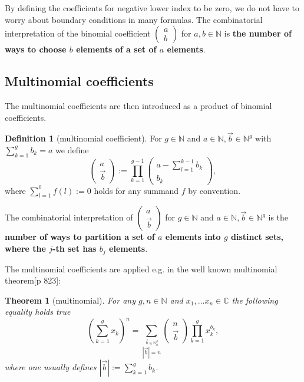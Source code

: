 \documentclass{article}
\theoremstyle{theorem}
\newtheorem{theorem}{Theorem}
\theoremstyle{definition}
\newtheorem*{definition}{Definition}
\begin{document}
By defining the coefficients for negative lower index to be zero, we do not have to worry about boundary conditions in
many formulas. The combinatorial interpretation of the binomial coefficient \(\begin{pmatrix}a \\ b\end{pmatrix}\) for
\(a,b\in\mathbb{N}\) is \textbf{the number of ways to choose \(b\) elements of a set of \(a\) elements}. 

\subsection*{Multinomial coefficients}

The multinomial coefficients are then introduced as a product of binomial coefficients.
\begin{definition}[multinomial coefficient]
For \(g\in\mathbb{N}\) and \(a\in\mathbb{N},\vec{b}\in\mathbb{N}^g\) with \(\sum_{k=1}^g b_k=a\)
we define
\begin{equation}
\begin{pmatrix}a\\\vec{b}\end{pmatrix}:= \prod_{k=1}^{g-1} \begin{pmatrix}a-\sum_{l=1}^{k-1} b_k\\b_k\end{pmatrix},
\end{equation}
where \(\sum_{l=1}^0 f(l):=0\) holds for any summand \(f\) by convention. 
\end{definition}

The combinatorial interpretation of \(\begin{pmatrix}a\\\vec{b}\end{pmatrix}\) for \(g\in\mathbb{N}\) and
 \(a\in\mathbb{N},\vec{b}\in\mathbb{N}^g\) is the \textbf{number of ways to partition a set of \(a\) elements into 
 \(g\) distinct sets, where the \(j\)-th set has \(b_j\) elements}. 
 
The multinomial coefficients are applied e.g. in the well known multinomial theorem\cite{abramowitz1964handbook}[p 823]:

\begin{theorem}[multinomial]
For any \(g,n\in\mathbb{N}\) and \(x_1,\dots x_n\in\mathbb{C}\) the following equality holds true
\begin{equation}
\left(\sum_{k=1}^g x_k\right)^n= \sum_{\stackrel{\vec{b}\in\mathbb{N}_0^g}{|\vec{b}|=n}}\begin{pmatrix}n\\\vec{b}\end{pmatrix} \prod_{k=1}^g x_k^{b_k},
\end{equation}
where one usually defines \(|\vec{b}|:=\sum_{k=1}^g b_k\). 
\end{theorem} 
\end{document}
